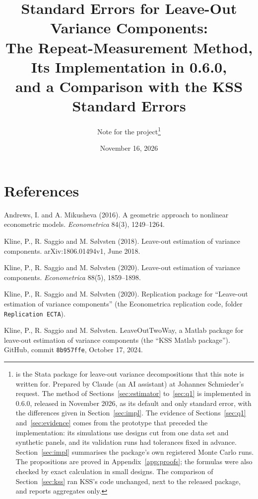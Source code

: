 \documentclass[11pt]{article}
\title{Standard Errors for Leave-Out Variance Components:\\ The Repeat-Measurement Method, Its Implementation in
\fevc{} 0.6.0,\\ and a Comparison with the KSS Standard Errors}
\author{Note for the \fevc{} project\thanks{\fevc{} is the Stata package for leave-out variance decompositions
that this note is written for. Prepared by Claude (an AI assistant) at Johannes Schmieder's request. The method
of Sections~\ref{sec:estimator} to~\ref{sec:q1} is implemented in \fevc{} 0.6.0, released in November 2026, as
its default and only standard error, with the differences given in Section~\ref{sec:impl}. The evidence of
Sections~\ref{sec:q1} and~\ref{sec:evidence} comes from the prototype that preceded the implementation: its
simulations use designs cut from one data set and synthetic panels, and its validation runs had tolerances fixed
in advance. Section~\ref{sec:impl} summarises the package's own registered Monte Carlo runs. The propositions are
proved in Appendix~\ref{app:proofs}; the formulas were also checked by exact calculation in small designs. The
comparison of Section~\ref{sec:kss} ran KSS's code unchanged, next to the released package, and reports aggregates
only.}}
\date{November 16, 2026}
\newcommand{\code}[1]{\texttt{#1}}
\begin{document}
\maketitle



{\small\tableofcontents}
\bigskip












\appendix
{\small

}






\section*{References}
Andrews, I. and A. Mikusheva (2016). A geometric approach to nonlinear econometric models. \emph{Econometrica}
84(3), 1249--1264.

\noindent Kline, P., R. Saggio and M. S{\o}lvsten (2018). Leave-out estimation of variance components. arXiv:1806.01494v1,
June 2018.

\noindent Kline, P., R. Saggio and M. S{\o}lvsten (2020). Leave-out estimation of variance components.
\emph{Econometrica} 88(5), 1859--1898.

\noindent Kline, P., R. Saggio and M. S{\o}lvsten (2020). Replication package for ``Leave-out estimation of variance
components'' (the Econometrica replication code, folder \code{Replication ECTA}).

\noindent Kline, P., R. Saggio and M. S{\o}lvsten. LeaveOutTwoWay, a Matlab package for leave-out estimation of
variance components (the ``KSS Matlab package''). GitHub, commit \code{8b957ffe}, October 17, 2024.
\end{document}
